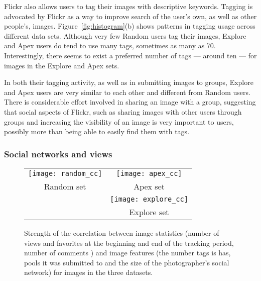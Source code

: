 \documentclass[]{article}
\newcommand{\source}[1]{\textsf{#1}}
\newcommand{\figref}[1]{Figure~\ref{#1}}
\begin{document}
Flickr also allows users to tag their images with descriptive
keywords. Tagging is advocated by Flickr as a way to improve search
of the user's own, as well as other people's, images.
\figref{fig:histogram}(b) shows patterns in tagging usage across
different data sets. Although very few \source{Random} users tag
their images, \source{Explore} and \source{Apex} users do tend to
use many tags, sometimes as many as 70. Interestingly, there seems
to exist a preferred number of tags --- around ten --- for images in
the \source{Explore} and \source{Apex} sets.

In both their tagging activity, as well as in submitting images to
groups, \source{Explore} and \source{Apex} users are very similar to
each other and different from \source{Random} users. There is
considerable effort involved in sharing an image with a group,
suggesting that social aspects of Flickr, such as sharing images
with other users through groups and increasing the visibility of an
image is very important to users, possibly more than being able to
easily find them with tags.

\subsubsection{Social networks and views}
\label{sec:socnetviews}

\begin{figure}[tbh]
 \begin{tabular}{cc}
  \texttt{[image: random\_cc]} &
  \texttt{[image: apex\_cc]} \\
  Random set  &  Apex set \\
  &\texttt{[image: explore\_cc]} \\
  & Explore set \\
\end{tabular}
  \caption{Strength of the correlation between image statistics (number of views and favorites at the beginning and end of the tracking
  period, number of comments ) and image features
  (the number tags is has, pools it was submitted to and the size of the photographer's social network)
  for images in the three datasets. }
  \label{fig:flickr-correlation}
\end{figure}
\end{document}
